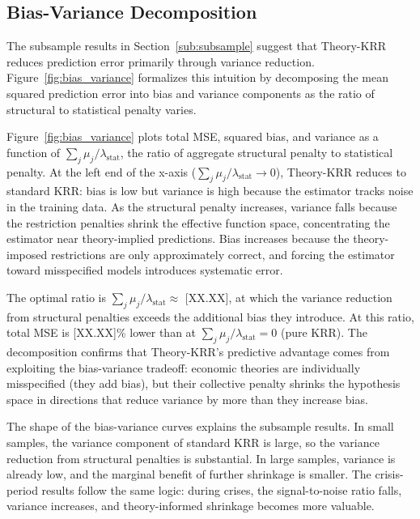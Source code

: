 \subsection{Bias-Variance Decomposition}\label{sub:bias_variance}

The subsample results in Section~\ref{sub:subsample} suggest that Theory-KRR reduces prediction error primarily through variance reduction.
Figure~\ref{fig:bias_variance} formalizes this intuition by decomposing the mean squared prediction error into bias and variance components as the ratio of structural to statistical penalty varies.

Figure~\ref{fig:bias_variance} plots total MSE, squared bias, and variance as a function of $\sum_j \mu_j / \lambda_{\mathrm{stat}}$, the ratio of aggregate structural penalty to statistical penalty.
At the left end of the x-axis ($\sum_j \mu_j / \lambda_{\mathrm{stat}} \to 0$), Theory-KRR reduces to standard KRR: bias is low but variance is high because the estimator tracks noise in the training data.
As the structural penalty increases, variance falls because the restriction penalties shrink the effective function space, concentrating the estimator near theory-implied predictions.
Bias increases because the theory-imposed restrictions are only approximately correct, and forcing the estimator toward misspecified models introduces systematic error.

The optimal ratio is $\sum_j \mu_j / \lambda_{\mathrm{stat}} \approx $ [XX.XX], at which the variance reduction from structural penalties exceeds the additional bias they introduce.
At this ratio, total MSE is [XX.XX]\% lower than at $\sum_j \mu_j / \lambda_{\mathrm{stat}} = 0$ (pure KRR).
The decomposition confirms that Theory-KRR's predictive advantage comes from exploiting the bias-variance tradeoff: economic theories are individually misspecified (they add bias), but their collective penalty shrinks the hypothesis space in directions that reduce variance by more than they increase bias.

The shape of the bias-variance curves explains the subsample results.
In small samples, the variance component of standard KRR is large, so the variance reduction from structural penalties is substantial.
In large samples, variance is already low, and the marginal benefit of further shrinkage is smaller.
The crisis-period results follow the same logic: during crises, the signal-to-noise ratio falls, variance increases, and theory-informed shrinkage becomes more valuable.


